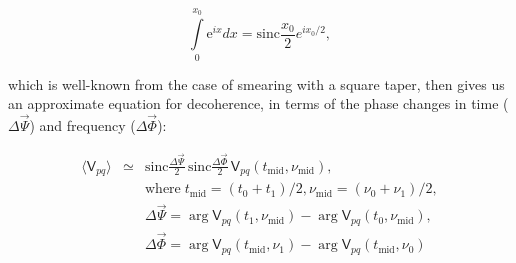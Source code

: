 \documentclass[]{aa}
\newcommand{\coh}[2]{\mathsf{{#1}}_{{#2}}}
\begin{document}
\[
\int\limits_{0}^{x_0}\mathrm{e}^{ix}dx = \mathrm{sinc}\frac{x_0}{2}e^{ix_0/2},
\]

which is well-known from the case of smearing with a square taper, then gives us an approximate equation for decoherence, in terms of the phase changes in time ($\Delta\vec\Psi$) and frequency ($\Delta\vec\Phi$):

\begin{eqnarray}\label{eq:smearing}
\langle \coh{V}{pq} \rangle & \simeq & \mathrm{sinc}\frac{\Delta\vec\Psi}{2}\,\mathrm{sinc}\frac{\Delta\vec\Phi}{2}\,\coh{V}{pq}(t_\mathrm{mid},\nu_\mathrm{mid}), \\
\nonumber && \mathrm{where} \; t_\mathrm{mid} = (t_0+t_1)/2, \nu_\mathrm{mid} = (\nu_0+\nu_1)/2, \\
\nonumber && \Delta\vec\Psi = \arg \coh{V}{pq}(t_1,\nu_\mathrm{mid}) - \arg \coh{V}{pq}(t_0,\nu_\mathrm{mid}), \\
\nonumber && \Delta\vec\Phi = \arg \coh{V}{pq}(t_\mathrm{mid},\nu_1) - \arg \coh{V}{pq}(t_\mathrm{mid},\nu_0) 
\end{eqnarray}
\end{document}
